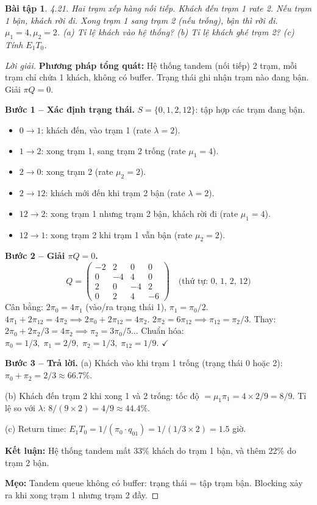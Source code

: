 \documentclass[8pt,a4paper]{article}
\newtheorem{exercise}{Bài tập}
\newenvironment{solution}{\begin{proof}[Lời giải]}{\end{proof}}
\begin{document}
\begin{exercise}
4.21. Hai trạm xếp hàng nối tiếp. Khách đến trạm 1 rate 2. Nếu trạm 1 bận, khách rời đi. Xong trạm 1 sang trạm 2 (nếu trống), bận thì rời đi. $\mu_1 = 4, \mu_2 = 2$. 
(a) Tỉ lệ khách vào hệ thống? (b) Tỉ lệ khách ghé trạm 2? (c) Tính $E_1 T_0$.
\end{exercise}
\begin{solution}
\textbf{Phương pháp tổng quát:} Hệ thống tandem (nối tiếp) 2 trạm, mỗi trạm chỉ chứa 1 khách, không có buffer. Trạng thái ghi nhận trạm nào đang bận. Giải $\pi Q = 0$.

\textbf{Bước 1 -- Xác định trạng thái.} $S = \{0, 1, 2, 12\}$: tập hợp các trạm đang bận.
\begin{itemize}[nosep]
\item $0 \to 1$: khách đến, vào trạm 1 (rate $\lambda = 2$).
\item $1 \to 2$: xong trạm 1, sang trạm 2 trống (rate $\mu_1 = 4$).
\item $2 \to 0$: xong trạm 2 (rate $\mu_2 = 2$).
\item $2 \to 12$: khách mới đến khi trạm 2 bận (rate $\lambda = 2$).
\item $12 \to 2$: xong trạm 1 nhưng trạm 2 bận, khách rời đi (rate $\mu_1 = 4$).
\item $12 \to 1$: xong trạm 2 khi trạm 1 vẫn bận (rate $\mu_2 = 2$).
\end{itemize}

\textbf{Bước 2 -- Giải $\pi Q = 0$.}
\[
Q = \begin{pmatrix}
-2 & 2 & 0 & 0 \\
0 & -4 & 4 & 0 \\
2 & 0 & -4 & 2 \\
0 & 2 & 4 & -6
\end{pmatrix}
\quad \text{(thứ tự: 0, 1, 2, 12)}
\]
Cân bằng: $2\pi_0 = 4\pi_1$ (vào/ra trạng thái 1), $\pi_1 = \pi_0/2$.
$4\pi_1 + 2\pi_{12} = 4\pi_2 \implies 2\pi_0 + 2\pi_{12} = 4\pi_2$.
$2\pi_2 = 6\pi_{12} \implies \pi_{12} = \pi_2/3$.
Thay: $2\pi_0 + 2\pi_2/3 = 4\pi_2 \implies \pi_2 = 3\pi_0/5$... Chuẩn hóa:
$\pi_0 = 1/3,\; \pi_1 = 2/9,\; \pi_2 = 1/3,\; \pi_{12} = 1/9$. $\checkmark$

\textbf{Bước 3 -- Trả lời.}
(a) Khách vào khi trạm 1 trống (trạng thái 0 hoặc 2): $\pi_0 + \pi_2 = \boxed{2/3 \approx 66.7\%}$.

(b) Khách đến trạm 2 khi xong 1 và 2 trống: tốc độ $= \mu_1 \pi_1 = 4 \times 2/9 = 8/9$. Tỉ lệ so với $\lambda$: $8/(9 \times 2) = \boxed{4/9 \approx 44.4\%}$.

(c) Return time: $E_1 T_0 = 1/(\pi_0 \cdot q_{01}) = 1/(1/3 \times 2) = \boxed{1.5}$ giờ.

\textbf{Kết luận:} Hệ thống tandem mất 33\% khách do trạm 1 bận, và thêm 22\% do trạm 2 bận.

\textbf{Mẹo:} Tandem queue không có buffer: trạng thái = tập trạm bận. Blocking xảy ra khi xong trạm 1 nhưng trạm 2 đầy.
\end{solution}
\end{document}
